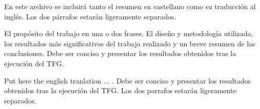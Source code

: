 En este archivo se incluirá tanto el resumen en castellano como su traducción al inglés. Los dos párrafos estarán ligeramente separados.

El  propósito  del  trabajo  en  una  o  dos  frases.  El  diseño  y metodología  utilizada,  los  resultados  más  significativos  del trabajo realizado y un breve resumen de las conclusiones. Debe ser conciso y presentar los resultados obtenidos tras la ejecución del TFG. 

\vspace{1.5cm}

Put here  the english tranlation  ... . Debe ser conciso y presentar los resultados obtenidos tras la ejecución del TFG. Los dos parrafos estarán ligeramente separados.

